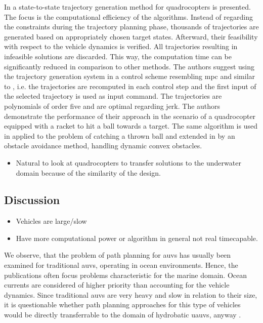 In \cite{Mueller13} a state-to-state trajectory generation method for quadrocopters is presented. The focus is the computational efficiency of the algorithms.
Instead of regarding the constraints during the trajectory planning phase, thousands of trajectories are generated based on appropriately chosen target states.
Afterward, their feasibility with respect to the vehicle dynamics is verified.
All trajectories resulting in infeasible solutions are discarded.
This way, the computation time can be significantly reduced in comparison to other methods.
The authors suggest using the trajectory generation system in a control scheme resembling \ac{mpc} and similar to \cite{Hehn11}, i.e. the trajectories are recomputed in each control step and the first input of the selected trajectory is used as input command. 
The trajectories are polynomials of order five and are optimal regarding jerk.
The authors demonstrate the performance of their approach in the scenario of a quadrocopter equipped with a racket to hit a ball towards a target. The same algorithm is used in \cite{MuellerHehn15} applied to the problem of catching a thrown ball and extended in \cite{Bucki19} by an obstacle avoidance method, handling dynamic convex obstacles.

\begin{itemize}
    \color{red}
    \item Natural to look at quadrocopters to transfer solutions to the underwater domain because of the similarity of the design.
\end{itemize}
\subsection{Discussion}

\begin{itemize}
    \color{red}
    \item Vehicles are large/slow
    \item Have more computational power or algorithm in general not real timecapable.
\end{itemize}

We observe, that the problem of path planning for \acp{auv} has usually been examined for traditional \acp{auv}, operating in ocean environments.
Hence, the publications often focus problems characteristic for the marine domain.
Ocean currents are considered of higher priority than accounting for the vehicle dynamics.
Since traditional \acp{auv} are very heavy and slow in relation to their size, it is questionable whether path planning approaches for this type of vehicles would be directly transferrable to the domain of hydrobatic \acp{uauv}, anyway \cite{hydrobatic}.

